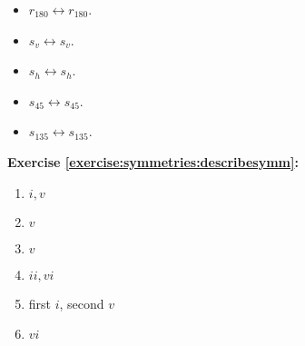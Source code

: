 \begin{enumerate}[(a)]
\begin{multicols}{3}
\begin{itemize}
	\item
	$r_{180} \leftrightarrow r_{180}$.
	
	\item
	$s_v \leftrightarrow s_v$.
	
	\item
	$s_h \leftrightarrow s_h$.
	
	\item
	$s_{45} \leftrightarrow s_{45}$.
	
	\item
	$s_{135} \leftrightarrow s_{135}$.
	\end{itemize}
	\end{multicols}
\end{enumerate}

\noindent\textbf{Exercise \ref{exercise:symmetries:describesymm}:}
\begin{multicols}{3}
\begin{enumerate}[{a.}]
\item
$i, v$

\item
$v$

\item
$v$

\item
$ii, vi$

\item
first $i$, second $v$

\item
$vi$
\end{enumerate}
\end{multicols}


